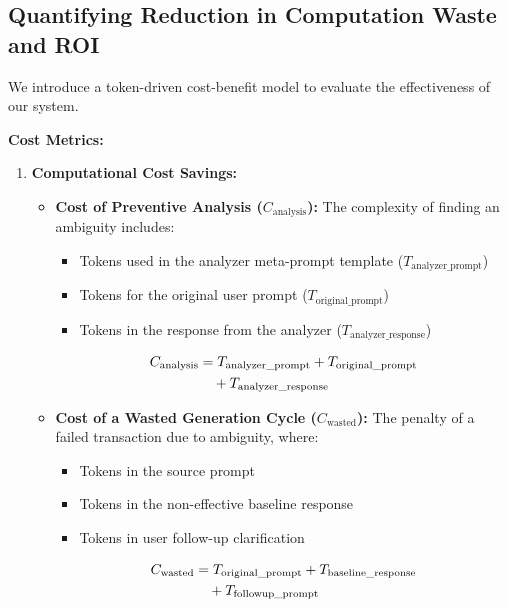 \documentclass[11pt,a4paper]{article}
\begin{document}
\subsection{Quantifying Reduction in Computation Waste and ROI}
We introduce a token-driven cost-benefit model to evaluate the effectiveness of our system.

\textbf{Cost Metrics:}
\begin{enumerate}
    \item \textbf{Computational Cost Savings:}
    \begin{itemize}
        \item \textbf{Cost of Preventive Analysis (\(C_{\text{analysis}}\)):}
            The complexity of finding an ambiguity includes:
        \begin{itemize}
            \item Tokens used in the analyzer meta-prompt template (\(T_{\text{analyzer\_prompt}}\))
            \item Tokens for the original user prompt (\(T_{\text{original\_prompt}}\))
            \item Tokens in the response from the analyzer (\(T_{\text{analyzer\_response}}\))
        \end{itemize}
        \begin{align}
        C_{\text{analysis}} &= T_{\text{analyzer\_prompt}} 
          + T_{\text{original\_prompt}} \notag \\
        &\quad + T_{\text{analyzer\_response}}
        \end{align}
        
        \item \textbf{Cost of a Wasted Generation Cycle (\(C_{\text{wasted}}\)):}
        The penalty of a failed transaction due to ambiguity, where:
        \begin{itemize}
            \item Tokens in the source prompt
            \item Tokens in the non-effective baseline response
            \item Tokens in user follow-up clarification
        \end{itemize}
        \begin{align}
        C_{\text{wasted}} &= T_{\text{original\_prompt}} 
          + T_{\text{baseline\_response}} \notag \\
        &\quad + T_{\text{followup\_prompt}}
        \end{align}
        

\end{itemize}
\end{enumerate}
\end{document}
